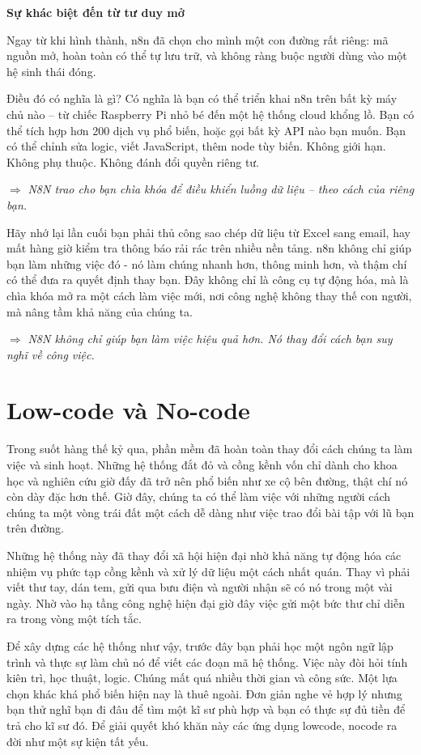 \textbf{Sự khác biệt đến từ tư duy mở}

Ngay từ khi hình thành, n8n đã chọn cho mình một con đường rất riêng: mã nguồn mở, hoàn toàn có thể tự lưu trữ, và không ràng buộc người dùng vào một hệ sinh thái đóng.

Điều đó có nghĩa là gì? Có nghĩa là bạn có thể triển khai n8n trên bất kỳ máy chủ nào – từ chiếc Raspberry Pi nhỏ bé đến một hệ thống cloud khổng lồ. Bạn có thể tích hợp hơn 200 dịch vụ phổ biến, hoặc gọi bất kỳ API nào bạn muốn. Bạn có thể chỉnh sửa logic, viết JavaScript, thêm node tùy biến. Không giới hạn. Không phụ thuộc. Không đánh đổi quyền riêng tư.

$\Rightarrow$ \textit{N8N trao cho bạn chìa khóa để điều khiển luồng dữ liệu – theo cách của riêng bạn.}

Hãy nhớ lại lần cuối bạn phải thủ công sao chép dữ liệu từ Excel sang email, hay mất hàng giờ kiểm tra thông báo rải rác trên nhiều nền tảng. n8n không chỉ giúp bạn làm những việc đó - nó làm chúng nhanh hơn, thông minh hơn, và thậm chí có thể đưa ra quyết định thay bạn. Đây không chỉ là công cụ tự động hóa, mà là chìa khóa mở ra một cách làm việc mới, nơi công nghệ không thay thế con người, mà nâng tầm khả năng của chúng ta.

$\Rightarrow$ \textit{N8N không chỉ giúp bạn làm việc hiệu quả hơn. Nó thay đổi cách bạn suy nghĩ về công việc.}
        
\newpage
\section{Low-code và No-code}
Trong suốt hàng thế kỷ qua, phần mềm đã hoàn toàn thay đổi cách chúng ta làm việc và sinh hoạt. Những hệ thống đắt đỏ và cồng kềnh vốn chỉ dành cho khoa học và nghiên cứu giờ đấy đã trở nên phổ biến như xe cộ bên đường, thật chí nó còn dày đặc hơn thế. Giờ đây, chúng ta có thể làm việc với những người cách chúng ta một vòng trái đất một cách dễ dàng như việc trao đổi bài tập với lũ bạn trên đường. 

Những hệ thống này đã thay đổi xã hội hiện đại nhờ khả năng tự động hóa các nhiệm vụ phức tạp cồng kềnh và xử lý dữ liệu một cách nhất quán. Thay vì phải viết thư tay, dán tem, gửi qua bưu điện và người nhận sẽ có nó trong một vài ngày. Nhờ vào hạ tầng công nghệ hiện đại giờ đây việc gửi một bức thư chỉ diễn ra trong vòng một tích tắc.


Để xây dựng các hệ thống như vậy, trước đây bạn phải học một ngôn ngữ lập trình và thực sự làm chủ nó để viết các đoạn mã hệ thống. Việc này đòi hỏi tính kiên trì, học thuật, logic. Chúng mất quá nhiều thời gian và công sức. Một lựa chọn khác khá phổ biến hiện nay là thuê ngoài. Đơn giản nghe vẻ hợp lý nhưng bạn thử nghĩ bạn đi đâu để tìm một kĩ sư phù hợp và bạn có thực sự đủ tiền để trả cho kĩ sư đó. Để giải quyết khó khăn này các ứng dụng lowcode, nocode ra đời như một sự kiện tất yếu.

